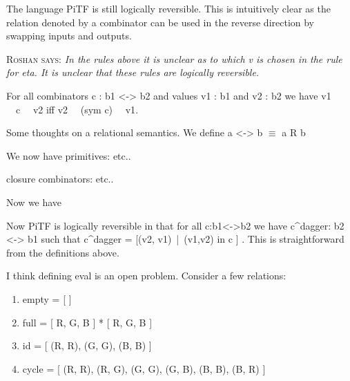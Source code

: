 \documentclass{llncs}
\newcommand{\roshan}[1]{\textsc{Roshan says:} 
  \textit{#1}
}
\begin{document}
The language {{PiTF}} is still logically reversible. This is intuitively
clear as the relation denoted by a combinator can be used in the reverse
direction by swapping inputs and outputs.

\roshan{ In the rules above it is unclear as to which v is chosen in
  the rule for eta. It is unclear that these rules are logically
  reversible.  }

\begin{proposition}
\label{chx:prop:logrev-tracep}
For all combinators {{c : b1 <-> b2}} and values {{v1 : b1}} and 
{{v2 : b2}} we have {{v1 ~~c~~ v2}} iff {{v2 ~~(sym c)~~ v1}}.
\end{proposition}

Some thoughts on a relational semantics. We define {{ a <-> b }}
$\equiv$ {{a R b}}

\noindent
We now have primitives:
etc..

\noindent
closure combinators:
etc..

\noindent
Now we have 

Now {{PiTF}} is logically reversible in that for all {{c:b1<->b2}} we
have {{c^{dagger}: b2 <-> b1}} such that 
%
{{c^{dagger} = {[(v2, v1)~|~(v1,v2) in c ]} }}. This is
straightforward from the definitions above. 

I think defining eval is an open problem.  Consider a few relations:

\begin{enumerate}
\item 
{{empty = {[ ]} }}

\item 
{{full =  {[ R, G, B ]} * {[ R, G, B ]} }}

\item 
{{id  =  {[ (R, R), (G, G), (B, B) ]} }}

\item 
{{cycle = {[ (R, R), (R, G), (G, G), (G, B), (B, B), (B, R) ]} }}
\end{enumerate}
 
\end{document}
